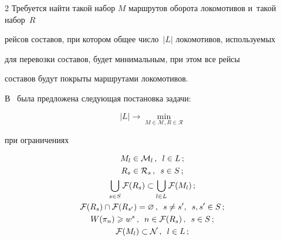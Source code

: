 \begin{multicols}{2}
Требуется найти такой набор $M$ маршрутов оборота локомотивов и~такой набор~$R$ 


рейсов составов, при котором общее число~$|L|$ локомотивов, используемых 


для перевозки составов, будет минимальным, при этом все рейсы 


составов будут покрыты маршрутами локомотивов.


    


В~\cite{AzanovBuyanov} была предложена следующая постановка задачи:





\noindent


\begin{equation}


    \label{problem_main}


    |L| \to \min_{M\in \mathcal M, R\in\mathcal R}


\end{equation}


    при ограничениях


    


    \noindent


\begin{gather}


        M_{l}\in\mathcal M_l\,,\enskip l\in L\,;    \label{c1}\\


    \label{c2}


        R_s \in \mathcal R_s\,,\enskip s\in S\,;\\


    \label{c3}


           \bigcup\limits_{s\in S} \mathcal F(R_s) \subset \bigcup\limits_{l\in L} \mathcal F(M_l)\,;\\


    \label{c4}


        \mathcal F(R_s)\cap \mathcal F(R_{s'}) = \varnothing\,, 


        \enskip s \ne s', \enskip s, s'\in S\,;\\


    \label{cadd1}


        W(\pi_n)\geqslant w^s\,,\enskip n\in\mathcal F(R_s)\,,\enskip s\in S\,;\\


    \label{c5}


        \mathcal F(M_l) \subset \mathcal N\,,\enskip l \in L\,;\\



\end{gather}
\end{multicols}
